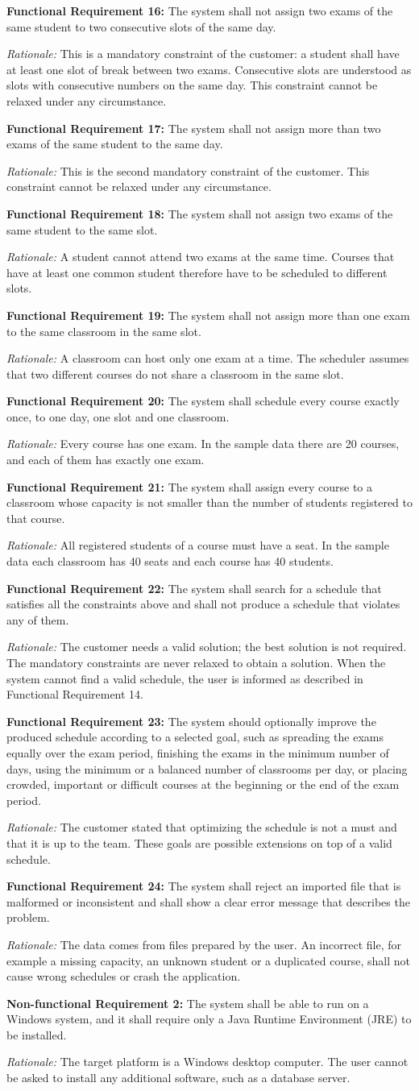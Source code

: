 \documentclass[11pt,a4paper]{article}
\newcommand{\reqitem}[3]{\par\vspace{2pt}\noindent\textbf{#1:} #2\par\nopagebreak
  \begin{list}{}{\setlength{\leftmargin}{1.2em}\setlength{\topsep}{0pt}\setlength{\itemsep}{0pt}\setlength{\parsep}{0pt}}\item\emph{Rationale:} #3\end{list}}
\begin{document}
\reqitem{Functional Requirement 16}{The system shall not assign two exams of the same student to two consecutive slots of the same day.}{This is a mandatory constraint of the customer: a student shall have at least one slot of break between two exams. Consecutive slots are understood as slots with consecutive numbers on the same day. This constraint cannot be relaxed under any circumstance.}
\reqitem{Functional Requirement 17}{The system shall not assign more than two exams of the same student to the same day.}{This is the second mandatory constraint of the customer. This constraint cannot be relaxed under any circumstance.}
\reqitem{Functional Requirement 18}{The system shall not assign two exams of the same student to the same slot.}{A student cannot attend two exams at the same time. Courses that have at least one common student therefore have to be scheduled to different slots.}
\reqitem{Functional Requirement 19}{The system shall not assign more than one exam to the same classroom in the same slot.}{A classroom can host only one exam at a time. The scheduler assumes that two different courses do not share a classroom in the same slot.}
\reqitem{Functional Requirement 20}{The system shall schedule every course exactly once, to one day, one slot and one classroom.}{Every course has one exam. In the sample data there are 20 courses, and each of them has exactly one exam.}
\reqitem{Functional Requirement 21}{The system shall assign every course to a classroom whose capacity is not smaller than the number of students registered to that course.}{All registered students of a course must have a seat. In the sample data each classroom has 40 seats and each course has 40 students.}
\reqitem{Functional Requirement 22}{The system shall search for a schedule that satisfies all the constraints above and shall not produce a schedule that violates any of them.}{The customer needs a valid solution; the best solution is not required. The mandatory constraints are never relaxed to obtain a solution. When the system cannot find a valid schedule, the user is informed as described in Functional Requirement 14.}
\reqitem{Functional Requirement 23}{The system should optionally improve the produced schedule according to a selected goal, such as spreading the exams equally over the exam period, finishing the exams in the minimum number of days, using the minimum or a balanced number of classrooms per day, or placing crowded, important or difficult courses at the beginning or the end of the exam period.}{The customer stated that optimizing the schedule is not a must and that it is up to the team. These goals are possible extensions on top of a valid schedule.}
\reqitem{Functional Requirement 24}{The system shall reject an imported file that is malformed or inconsistent and shall show a clear error message that describes the problem.}{The data comes from files prepared by the user. An incorrect file, for example a missing capacity, an unknown student or a duplicated course, shall not cause wrong schedules or crash the application.}
\reqitem{Non-functional Requirement 2}{The system shall be able to run on a Windows system, and it shall require only a Java Runtime Environment (JRE) to be installed.}{The target platform is a Windows desktop computer. The user cannot be asked to install any additional software, such as a database server.}
\end{document}
